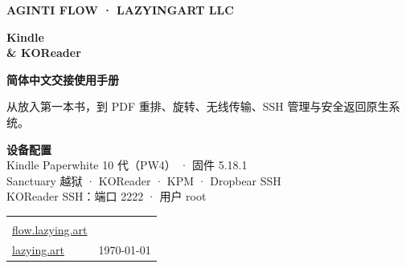 \documentclass[10pt,a4paper]{article}
\begin{document}
\color{Ink}

\begin{titlepage}
\pagecolor{Paper}
\thispagestyle{empty}

\vspace*{10mm}

{\sffamily\bfseries\fontsize{13}{16}\selectfont\color{Amber}
AGINTI FLOW · LAZYINGART LLC\par}

\vspace{16mm}

{\sffamily\bfseries\fontsize{35}{41}\selectfont\color{ForestDark}
Kindle\\[-0.05em]
\& KOReader\par}

\vspace{4mm}

{\sffamily\bfseries\fontsize{23}{29}\selectfont\color{Ink}
简体中文交接使用手册\par}

\vspace{7mm}

{\large
从放入第一本书，到 PDF 重排、旋转、无线传输、SSH 管理与安全返回原生系统。\par}

\vspace{14mm}

\begin{tcolorbox}[
  enhanced,
  colback=Forest,
  colframe=Forest,
  boxrule=0pt,
  arc=3mm,
  left=5mm,right=5mm,top=4mm,bottom=4mm
]
\color{white}
\sffamily
\textbf{设备配置}\\[0.35em]
Kindle Paperwhite 10 代（PW4） · 固件 5.18.1\\
Sanctuary 越狱 · KOReader · KPM · Dropbear SSH\\
KOReader SSH：端口 2222 · 用户 root
\end{tcolorbox}

\vfill

\begin{tabularx}{\textwidth}{@{}Xr@{}}
\begin{tabular}[b]{@{}l@{}}
{\sffamily\small\color{Slate}编写：\textbf{AgInTi Flow, LazyingArt LLC}}\\
{\sffamily\small\color{Slate}\href{https://flow.lazying.art}{flow.lazying.art}}\\
{\sffamily\small\color{Slate}\href{https://lazying.art}{lazying.art}}
\end{tabular}
&
{\sffamily\small\color{Slate}\today}\\
\end{tabularx}

\end{titlepage}
\nopagecolor
\end{document}
